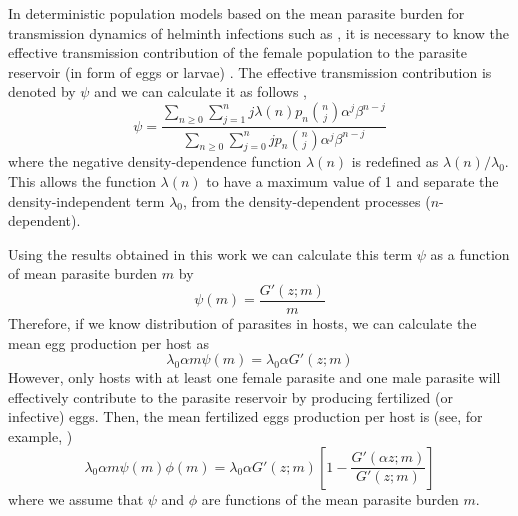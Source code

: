 \documentclass[12pt,a4paper]{article}
\theoremstyle{plain}%
\theoremstyle{definition}
\theoremstyle{remark}
\begin{document}
	In deterministic population models based on the mean parasite burden for transmission dynamics of helminth infections such as 
	\cite{anderson1985helminth,anderson1992infectious,truscott2014modeling}, 
	it is necessary to know the effective transmission contribution of the  female population to the parasite reservoir (in form of eggs or larvae)  \cite{churcher2005density,churcher2006density}.
	The effective transmission contribution is denoted by $\psi$ and we can calculate it as follows \cite{churcher2005density,churcher2006density},
	\begin{equation}\label{psi}
	\psi=\frac{\sum_{n\geq 0}\sum_{j=1}^{n}j\lambda(n)p_n\binom{n}{j}\alpha^j\beta^{n-j}}
	{\sum_{n\geq 0}\sum_{j=0}^{n}jp_n\binom{n}{j}\alpha^j\beta^{n-j}}
	\end{equation}
	where the negative density-dependence function $\lambda(n)$ is redefined as $\lambda(n)/\lambda_0$.
	This allows the function $\lambda(n)$ to have a maximum value of 1
	and separate the density-independent term $\lambda_0$, from the density-dependent processes ($n$-dependent).
	
	Using the results obtained in this work we can calculate this term $\psi$ as a function of mean parasite burden $m$ by
	\begin{equation}\label{psi}
	\psi(m)%
	=\frac{G'(z;m)}{m}   
	\end{equation}
	Therefore, if we know distribution of parasites in hosts, 
	we can calculate the mean egg production per host as
	\begin{equation}
	\lambda_0\alpha m \psi(m)=\lambda_0 \alpha G'(z;m) 
	\end{equation} 
	However, only hosts with at least one female parasite and one male parasite will effectively contribute to the parasite reservoir by producing fertilized (or infective) eggs.
	Then, the mean fertilized eggs production per host is
	(see, for example,  \citep{anderson1992infectious})
	\begin{equation}
	\lambda_0\alpha m \psi(m) \phi(m)= \lambda_0 \alpha G'(z;m) \left[1-\frac{ G'(\alpha z;m)}{G'(z;m)}\right] 	
	\end{equation}
	where we assume that $\psi$ and $\phi$ are functions of the mean parasite burden $m$.  
	
\end{document}
